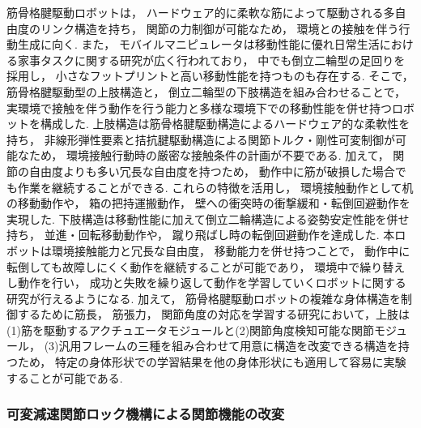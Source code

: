 \documentclass[twocolumn]{d-abst}
\begin{document}
筋骨格腱駆動ロボットは， ハードウェア的に柔軟な筋によって駆動される多自由度のリンク構造を持ち， 関節の力制御が可能なため， 環境との接触を伴う行動生成に向く. また， モバイルマニピュレータは移動性能に優れ日常生活における家事タスクに関する研究が広く行われており， 中でも倒立二輪型の足回りを採用し， 小さなフットプリントと高い移動性能を持つものも存在する. そこで， 筋骨格腱駆動型の上肢構造と， 倒立二輪型の下肢構造を組み合わせることで， 実環境で接触を伴う動作を行う能力と多様な環境下での移動性能を併せ持つロボットを構成した. 上肢構造は筋骨格腱駆動構造によるハードウェア的な柔軟性を持ち， 非線形弾性要素と拮抗腱駆動構造による関節トルク・剛性可変制御が可能なため， 環境接触行動時の厳密な接触条件の計画が不要である. 加えて， 関節の自由度よりも多い冗長な自由度を持つため， 動作中に筋が破損した場合でも作業を継続することができる. これらの特徴を活用し， 環境接触動作として机の移動動作や， 箱の把持運搬動作， 壁への衝突時の衝撃緩和・転倒回避動作を実現した. 下肢構造は移動性能に加えて倒立二輪構造による姿勢安定性能を併せ持ち， 並進・回転移動動作や， 蹴り飛ばし時の転倒回避動作を達成した. 本ロボットは環境接触能力と冗長な自由度， 移動能力を併せ持つことで， 動作中に転倒しても故障しにくく動作を継続することが可能であり， 環境中で繰り替えし動作を行い， 成功と失敗を繰り返して動作を学習していくロボットに関する研究が行えるようになる. 加えて， 筋骨格腱駆動ロボットの複雑な身体構造を制御するために筋長， 筋張力， 関節角度の対応を学習する研究において，上肢は(1)筋を駆動するアクチュエータモジュールと(2)関節角度検知可能な関節モジュール， (3)汎用フレームの三種を組み合わせて用意に構造を改変できる構造を持つため， 特定の身体形状での学習結果を他の身体形状にも適用して容易に実験することが可能である. %

\subsubsection{可変減速関節ロック機構による関節機能の改変}
\end{document}
